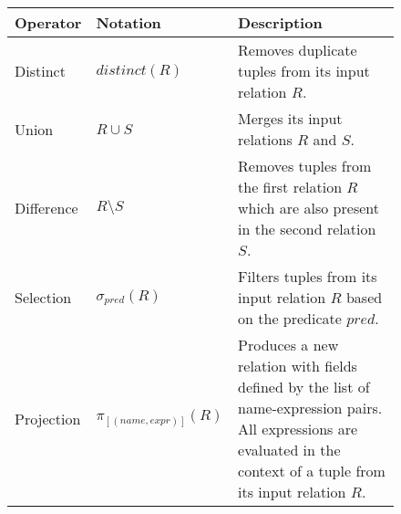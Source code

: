 \begin{figure}[htpb]
	\centering
	\begin{tabular}{@{}p{}p{}p{}@{}}
		\toprule
		Operator           & Notation                                             & Description                                                                                                                                                                                                                                                                                                       \\
		\midrule
		Distinct           & \(\mathit{distinct}(R)\)                             & Removes duplicate tuples from its input relation \(R\).                                                                                                                                                                                                                                                           \\
		Union              & \(R \cup S\)                                         & Merges its input relations \(R\) and \(S\).                                                                                                                                                                                                                                                                       \\
		Difference         & \(R \setminus S\)                                    & Removes tuples from the first relation \(R\) which are also present in the second relation \(S\).                                                                                                                                                                                                                 \\
		Selection          & \(\sigma_{\mathit{pred}}(R)\)                        & Filters tuples from its input relation \(R\) based on the predicate \(\mathit{pred}\).                                                                                                                                                                                                                            \\
		Projection         & \(\pi_{[(\mathit{name},\mathit{expr})]}(R)\)         & Produces a new relation with fields defined by the list of name-expression pairs. All expressions are evaluated in the context of a tuple from its input relation \(R\).                                                                                                                                          \\

\end{tabular}
\end{figure}
